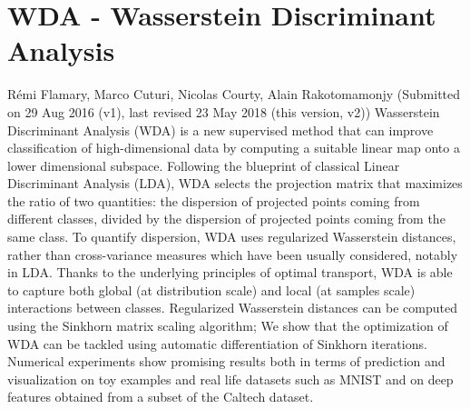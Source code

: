 \section*{WDA - Wasserstein Discriminant Analysis}

Rémi Flamary, Marco Cuturi, Nicolas Courty, Alain Rakotomamonjy
(Submitted on 29 Aug 2016 (v1), last revised 23 May 2018 (this version, v2))
Wasserstein Discriminant Analysis (WDA) is a new supervised method that can improve classification of high-dimensional data by computing a suitable linear map onto a lower dimensional subspace. Following the blueprint of classical Linear Discriminant Analysis (LDA), WDA selects the projection matrix that maximizes the ratio of two quantities: the dispersion of projected points coming from different classes, divided by the dispersion of projected points coming from the same class. To quantify dispersion, WDA uses regularized Wasserstein distances, rather than cross-variance measures which have been usually considered, notably in LDA. Thanks to the underlying principles of optimal transport, WDA is able to capture both global (at distribution scale) and local (at samples scale) interactions between classes. Regularized Wasserstein distances can be computed using the Sinkhorn matrix scaling algorithm; We show that the optimization of WDA can be tackled using automatic differentiation of Sinkhorn iterations. Numerical experiments show promising results both in terms of prediction and visualization on toy examples and real life datasets such as MNIST and on deep features obtained from a subset of the Caltech dataset. 